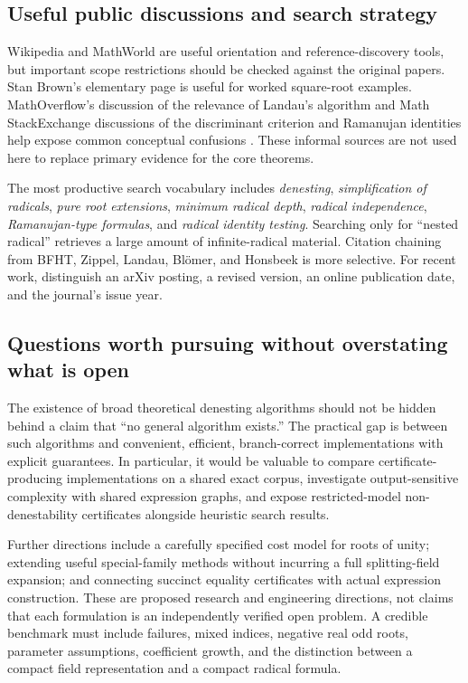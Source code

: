 \documentclass[11pt,a4paper]{article}
\numberwithin{equation}{section}
\theoremstyle{definition}\newtheorem{definition}[theorem]{Definition}
\theoremstyle{remark}\newtheorem{remark}[theorem]{Remark}
\begin{document}
\subsection{Useful public discussions and search strategy}
Wikipedia and MathWorld are useful orientation and reference-discovery tools, but important scope restrictions should be checked against the original papers. Stan Brown's elementary page is useful for worked square-root examples. MathOverflow's discussion of the relevance of Landau's algorithm and Math StackExchange discussions of the discriminant criterion and Ramanujan identities help expose common conceptual confusions \cite{wiki,mathworld,brown,mo,mse}. These informal sources are not used here to replace primary evidence for the core theorems.

The most productive search vocabulary includes \emph{denesting}, \emph{simplification of radicals}, \emph{pure root extensions}, \emph{minimum radical depth}, \emph{radical independence}, \emph{Ramanujan-type formulas}, and \emph{radical identity testing}. Searching only for ``nested radical'' retrieves a large amount of infinite-radical material. Citation chaining from BFHT, Zippel, Landau, Bl\"omer, and Honsbeek is more selective. For recent work, distinguish an arXiv posting, a revised version, an online publication date, and the journal's issue year.

\subsection{Questions worth pursuing without overstating what is open}
The existence of broad theoretical denesting algorithms should not be hidden behind a claim that ``no general algorithm exists.'' The practical gap is between such algorithms and convenient, efficient, branch-correct implementations with explicit guarantees. In particular, it would be valuable to compare certificate-producing implementations on a shared exact corpus, investigate output-sensitive complexity with shared expression graphs, and expose restricted-model non-denestability certificates alongside heuristic search results.

Further directions include a carefully specified cost model for roots of unity; extending useful special-family methods without incurring a full splitting-field expansion; and connecting succinct equality certificates with actual expression construction. These are proposed research and engineering directions, not claims that each formulation is an independently verified open problem. A credible benchmark must include failures, mixed indices, negative real odd roots, parameter assumptions, coefficient growth, and the distinction between a compact field representation and a compact radical formula.
\end{document}
